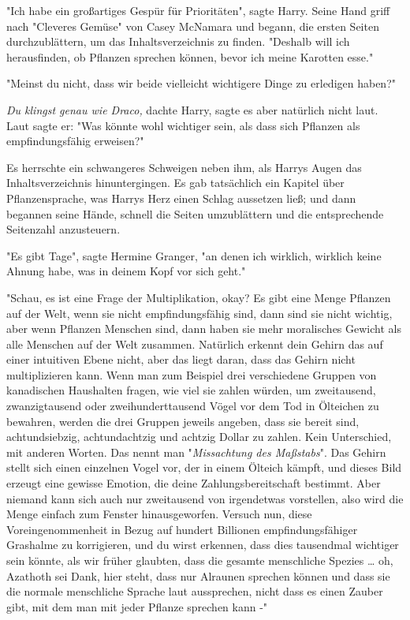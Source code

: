 {"Ich habe ein großartiges Gespür für Prioritäten", sagte Harry. Seine Hand griff nach "Cleveres Gemüse" von Casey McNamara und begann, die ersten Seiten durchzublättern, um das Inhaltsverzeichnis zu finden. "Deshalb will ich herausfinden, ob Pflanzen sprechen können, bevor ich meine Karotten esse."

"Meinst du nicht, dass wir beide vielleicht wichtigere Dinge zu erledigen haben?"

\emph{Du klingst genau wie Draco,} dachte Harry, sagte es aber natürlich nicht laut.\\ Laut sagte er: "Was könnte wohl wichtiger sein, als dass sich Pflanzen als empfindungsfähig erweisen?"

Es herrschte ein schwangeres Schweigen neben ihm, als Harrys Augen das Inhaltsverzeichnis hinuntergingen. Es gab tatsächlich ein Kapitel über Pflanzensprache, was Harrys Herz einen Schlag aussetzen ließ; und dann begannen seine Hände, schnell die Seiten umzublättern und die entsprechende Seitenzahl anzusteuern.

"Es gibt Tage", sagte Hermine Granger, "an denen ich wirklich, wirklich keine Ahnung habe, was in deinem Kopf vor sich geht."

"Schau, es ist eine Frage der Multiplikation, okay? Es gibt eine Menge Pflanzen auf der Welt, wenn sie nicht empfindungsfähig sind, dann sind sie nicht wichtig, aber wenn Pflanzen Menschen sind, dann haben sie mehr moralisches Gewicht als alle Menschen auf der Welt zusammen. Natürlich erkennt dein Gehirn das auf einer intuitiven Ebene nicht, aber das liegt daran, dass das Gehirn nicht multiplizieren kann. Wenn man zum Beispiel drei verschiedene Gruppen von kanadischen Haushalten fragen, wie viel sie zahlen würden, um zweitausend, zwanzigtausend oder zweihunderttausend Vögel vor dem Tod in Ölteichen zu bewahren, werden die drei Gruppen jeweils angeben, dass sie bereit sind, achtundsiebzig, achtundachtzig und achtzig Dollar zu zahlen. Kein Unterschied, mit anderen Worten. Das nennt man "\emph{Missachtung des Maßstabs}". Das Gehirn stellt sich einen einzelnen Vogel vor, der in einem Ölteich kämpft, und dieses Bild erzeugt eine gewisse Emotion, die deine Zahlungsbereitschaft bestimmt. Aber niemand kann sich auch nur zweitausend von irgendetwas vorstellen, also wird die Menge einfach zum Fenster hinausgeworfen. Versuch nun, diese Voreingenommenheit in Bezug auf hundert Billionen empfindungsfähiger Grashalme zu korrigieren, und du wirst erkennen, dass dies tausendmal wichtiger sein könnte, als wir früher glaubten, dass die gesamte menschliche Spezies … oh, Azathoth sei Dank, hier steht, dass nur Alraunen sprechen können und dass sie die normale menschliche Sprache laut aussprechen, nicht dass es einen Zauber gibt, mit dem man mit jeder Pflanze sprechen kann -"

}
